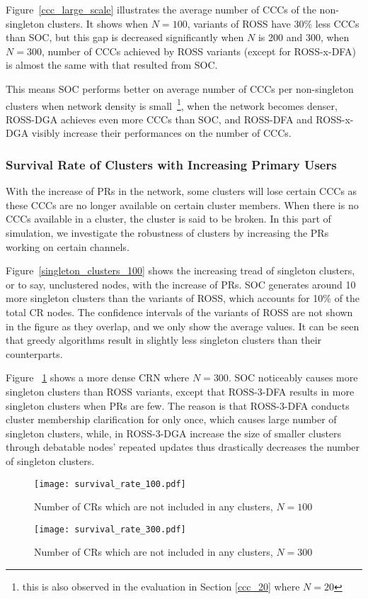 Figure~\ref{ccc_large_scale} illustrates the average number of CCCs of the non-singleton clusters.
It shows when $N=100$, variants of ROSS have 30\% less CCCs than SOC, but this gap is decreased significantly when $N$ is 200 and 300, \ie when $N=300$, number of CCCs achieved by ROSS variants (except for ROSS-x-DFA) is almost the same with that resulted from SOC.

This means SOC performs better on average number of CCCs per non-singleton clusters when network density is small~\footnote{this is also observed in the evaluation in Section \ref{ccc_20} where $N=20$}, when the network becomes denser, ROSS-DGA achieves even more CCCs than SOC, and ROSS-DFA and ROSS-x-DGA visibly increase their performances on the number of CCCs.




\subsubsection*{Survival Rate of Clusters with Increasing Primary Users}
With the increase of PRs in the network, some clusters will lose certain CCCs as these CCCs are no longer available on certain cluster members.
When there is no CCCs available in a cluster, the cluster is said to be broken.
In this part of simulation, we investigate the robustness of clusters by increasing the PRs working on certain channels.
 
Figure~\ref{singleton_clusters_100} shows the increasing tread of singleton clusters, or to say, unclustered nodes, with the increase of PRs.
SOC generates around 10 more singleton clusters than the variants of ROSS, which accounts for 10\% of the total CR nodes.
The confidence intervals of the variants of ROSS are not shown in the figure as they overlap, and we only show the average values.
It can be seen that greedy algorithms result in slightly less singleton clusters than their counterparts.

Figure ~\ref{singleton_clusters_300} shows a more dense CRN where $N=300$.
SOC noticeably causes more singleton clusters than ROSS variants, except that ROSS-3-DFA results in more singleton clusters when PRs are few.
The reason is that ROSS-3-DFA conducts cluster membership clarification for only once, which causes large number of singleton clusters, while, in ROSS-3-DGA increase the size of smaller clusters through debatable nodes' repeated updates thus drastically decreases the number of singleton clusters.

\begin{figure}[h!]
  \centering
  \texttt{[image: survival\_rate\_100.pdf]}
  \caption{Number of CRs which are not included in any clusters, $N=100$}
  \label{singleton_clusters_100}
   \texttt{[image: survival\_rate\_300.pdf]}
  \caption{Number of CRs which are not included in any clusters, $N=300$}
  \label{singleton_clusters_300}
\end{figure}

